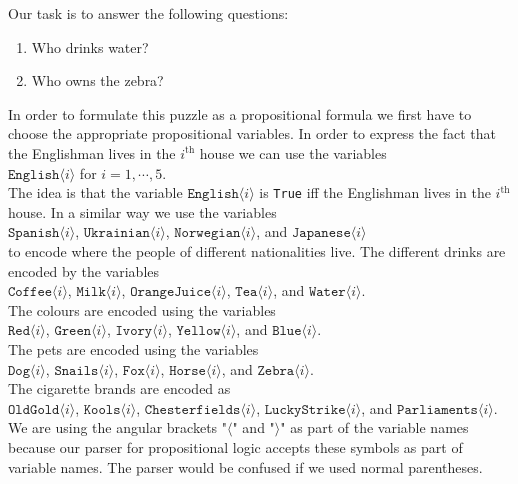 Our task is to answer the following questions:
\begin{enumerate}
\item Who drinks water?
\item Who owns the zebra?
\end{enumerate}

In order to formulate this puzzle as a propositional formula we first have to
choose the appropriate propositional variables.  In order to express the fact
that the Englishman lives in the $i^\textrm{th}$ house we can use the variables
\\[0.2cm]
\hspace*{1.3cm}
$\texttt{English}\langle i \rangle$ \quad for $i=1,\cdots,5$.
\\[0.2cm]
The idea is that the variable $\texttt{English}\langle i \rangle$ is \texttt{True} iff the
Englishman lives in the  $i^\textrm{th}$ house.  In a similar way we use the
variables
\\[0.2cm]
\hspace*{1.3cm}
$\texttt{Spanish}\langle i \rangle$,\;
$\texttt{Ukrainian}\langle i \rangle$,\;
$\texttt{Norwegian}\langle i \rangle$,\; and 
$\texttt{Japanese}\langle i \rangle$
\\[0.2cm]
to encode where the people of different nationalities live.
The different drinks are encoded by the variables
\\[0.2cm]
\hspace*{1.3cm}
$\texttt{Coffee}\langle i \rangle$,\; $\texttt{Milk}\langle i \rangle$,\; $\texttt{OrangeJuice}\langle i \rangle$,\; $\texttt{Tea}\langle i \rangle$,\; and $\texttt{Water}\langle i \rangle$.
\\[0.2cm] 
The colours are encoded using the variables 
\\[0.2cm]
\hspace*{1.3cm}
$\texttt{Red}\langle i \rangle$,\;
$\texttt{Green}\langle i \rangle$,\;
$\texttt{Ivory}\langle i \rangle$,\;
$\texttt{Yellow}\langle i \rangle$,\; and $\texttt{Blue}\langle i \rangle$.
\\[0.2cm]
The pets are encoded using the variables
\\[0.2cm]
\hspace*{1.3cm}
$\texttt{Dog}\langle i \rangle$,\;
$\texttt{Snails}\langle i \rangle$,\;
$\texttt{Fox}\langle i \rangle$,\;
$\texttt{Horse}\langle i \rangle$,\;
and $\texttt{Zebra}\langle i \rangle$.
\\[0.2cm]
The cigarette brands are encoded as
\\[0.2cm]
\hspace*{1.3cm}
$\texttt{OldGold}\langle i \rangle$,\; $\texttt{Kools}\langle i \rangle$,\;
$\texttt{Chesterfields}\langle i \rangle$,\; $\texttt{LuckyStrike}\langle i \rangle$,\; and
$\texttt{Parliaments}\langle i \rangle$.
\\[0.2cm]
We are using the angular brackets "$\langle$" and "$\rangle$" as part of the
variable names because our parser for propositional logic accepts these symbols
as part of variable names.  The parser would be confused if we used
normal parentheses.  

